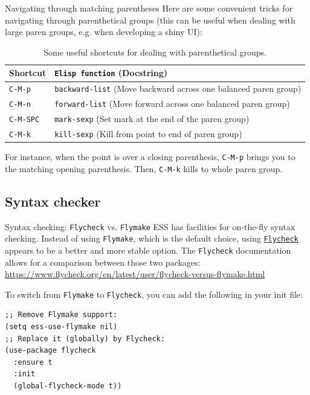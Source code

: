 \documentclass[presentation]{beamer}
\begin{document}
\begin{frame}[label={sec:org1fc1a32},fragile]{Navigating through matching parentheses}
 Here are some convenient tricks for navigating through parenthetical groups (this can be useful when dealing with large paren groups, e.g. when developing a shiny UI):

\small

\begin{table}[htbp]
\centering
\begin{tabular}{ll}
\hline
Shortcut & \texttt{Elisp function} (Docstring)\\
\hline
\texttt{C-M-p} & \texttt{backward-list} (Move backward across one balanced paren group)\\
\texttt{C-M-n} & \texttt{forward-list} (Move forward across one balanced paren group)\\
\texttt{C-M-SPC} & \texttt{mark-sexp} (Set mark at the end of the paren group)\\
\texttt{C-M-k} & \texttt{kill-sexp} (Kill from point to end of paren group)\\
\hline
\end{tabular}
\caption{Some useful shortcuts for dealing with parenthetical groups.}

\end{table}

\normalsize

For instance, when the point is over a closing parenthesis, \texttt{C-M-p} brings you to the matching opening parenthesis. Then, \texttt{C-M-k} kills to whole paren group.
\end{frame}

\subsection{Syntax checker}
\label{sec:orga943e24}
\begin{frame}[label={sec:org25bff6e},fragile]{Syntax checking: \texttt{Flycheck} vs. \texttt{Flymake}}
 ESS has facilities for on-the-fly syntax checking. Instead of using \texttt{Flymake}, which is the default choice, using \href{https://www.flycheck.org/en/latest/}{\texttt{Flycheck}} appears to be a better and more stable option. The \texttt{Flycheck} documentation allows for a comparison between those two packages:
\url{https://www.flycheck.org/en/latest/user/flycheck-versus-flymake.html}

To switch from \texttt{Flymake} to \texttt{Flycheck}, you can add the following in your init file:

\begin{verbatim}
;; Remove Flymake support:
(setq ess-use-flymake nil)
;; Replace it (globally) by Flycheck:
(use-package flycheck
  :ensure t
  :init
  (global-flycheck-mode t))
\end{verbatim}
\end{frame}
\end{document}
